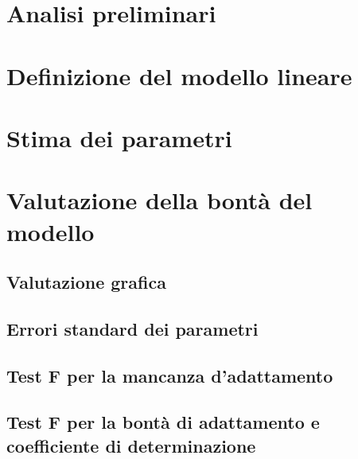 \documentclass[a4paper,12pt,oneside]{book}
\begin{document}
\hypertarget{analisi-preliminari}{%
\section{Analisi preliminari}\label{analisi-preliminari}}

\hypertarget{definizione-del-modello-lineare-1}{%
\section{Definizione del modello lineare}\label{definizione-del-modello-lineare-1}}

\hypertarget{stima-dei-parametri-3}{%
\section{Stima dei parametri}\label{stima-dei-parametri-3}}

\hypertarget{valutazione-della-bontuxe0-del-modello}{%
\section{Valutazione della bontà del modello}\label{valutazione-della-bontuxe0-del-modello}}

\hypertarget{valutazione-grafica}{%
\subsection{Valutazione grafica}\label{valutazione-grafica}}

\hypertarget{errori-standard-dei-parametri}{%
\subsection{Errori standard dei parametri}\label{errori-standard-dei-parametri}}

\hypertarget{test-f-per-la-mancanza-dadattamento}{%
\subsection{Test F per la mancanza d'adattamento}\label{test-f-per-la-mancanza-dadattamento}}

\hypertarget{test-f-per-la-bontuxe0-di-adattamento-e-coefficiente-di-determinazione}{%
\subsection{Test F per la bontà di adattamento e coefficiente di determinazione}\label{test-f-per-la-bontuxe0-di-adattamento-e-coefficiente-di-determinazione}}
\end{document}
